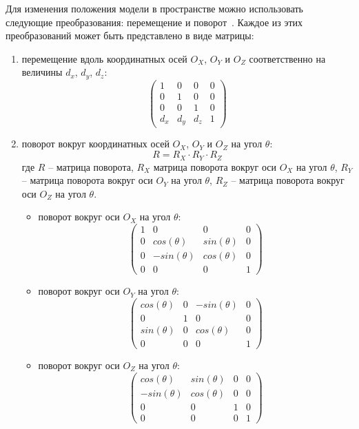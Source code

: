 Для изменения положения модели в пространстве можно использовать следующие преобразования: перемещение и поворот~\cite{lit15}. Каждое из этих преобразований может быть представлено в виде матрицы:
\begin{enumerate}
	\item перемещение вдоль координатных осей $O_X$, $O_Y$ и $O_Z$ соответственно на величины $d_x$, $d_y$, $d_z$:
	\begin{equation}
		\begin{pmatrix}
			1 & 0 & 0 & 0 \\
			0 & 1 & 0 & 0 \\
			0 & 0 & 1 & 0 \\
			d_x & d_y & d_z & 1
		\end{pmatrix}
	\end{equation}
	\item поворот вокруг координатных осей $O_X$, $O_Y$ и $O_Z$ на угол $\theta$:
	\begin{equation}
		R = R_X \cdot R_Y \cdot R_Z
	\end{equation}
	где $R$ -- матрица поворота, $R_X$ матрица поворота вокруг оси $O_X$ на угол $\theta$, $R_Y$ -- матрица поворота вокруг оси $O_Y$ на угол $\theta$, $R_Z$ -- матрица поворота вокруг оси $O_Z$ на угол $\theta$.
	\begin{itemize}[label=--]
		\item поворот вокруг оси $O_X$ на угол $\theta$:
		\begin{equation}
			\begin{pmatrix}
				1 & 0 & 0 & 0 \\
				0 & cos(\theta) & sin(\theta) & 0 \\
				0 & -sin(\theta) & cos(\theta) & 0 \\
				0 & 0 & 0 & 1
			\end{pmatrix}
		\end{equation}
		\item поворот вокруг оси $O_Y$ на угол $\theta$:
		\begin{equation}
			\begin{pmatrix}
				cos(\theta) & 0 & -sin(\theta) & 0 \\
				0 & 1 & 0 & 0 \\
				sin(\theta) & 0 & cos(\theta) & 0 \\
				0 & 0 & 0 & 1
			\end{pmatrix}
		\end{equation}
		\item поворот вокруг оси $O_Z$ на угол $\theta$:
		\begin{equation}
			\begin{pmatrix}
				cos(\theta) & sin(\theta) & 0 & 0 \\
				-sin(\theta) & cos(\theta) & 0 & 0 \\
				0 & 0 & 1 & 0 \\
				0 & 0 & 0 & 1
			\end{pmatrix}
		\end{equation}
	\end{itemize}
\end{enumerate}

